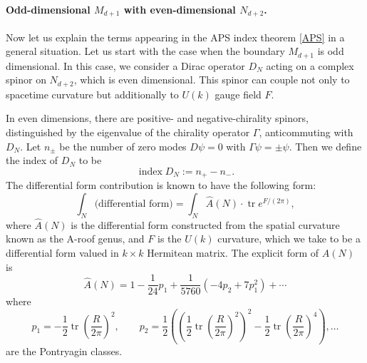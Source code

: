 \documentclass[12pt]{article}
\numberwithin{equation}{section}
\numberwithin{figure}{section}
\theoremstyle{remark}
\def\index{\mathop{\mathrm{index}}}
\def\tr{\mathop{\mathrm{tr}}\nolimits}
\begin{document}
\paragraph{Odd-dimensional $M_{d+1}$ with even-dimensional $N_{d+2}$.}

Now let us explain the terms appearing in the APS index theorem \eqref{APS}
in a general situation.
Let us start with the case when the boundary $M_{d+1}$ is odd dimensional.
In this case, we consider a Dirac operator $D_N$ acting on a complex spinor on $N_{d+2}$, which is even dimensional.
This spinor can couple not only to spacetime curvature but additionally to $U(k)$ gauge field $F$.

In even dimensions, there are positive- and negative-chirality spinors, distinguished by the eigenvalue of the chirality operator $\Gamma$, anticommuting with $D_N$.
Let $n_\pm$ be the number of zero modes $D\psi=0$ with $\Gamma\psi=\pm \psi$.
Then we define the index of $D_N$ to be \begin{equation}
\index D_N := n_+ - n_-.
\end{equation}
The differential form contribution is known to have the following form:
\begin{equation}
\int_N \text{(differential form)} = \int_N \hat A(N) \cdot \tr e^{F/(2\pi)},
\end{equation}
where $\hat A(N)$ is the differential form constructed from the spatial curvature known as the A-roof genus,
and $F$ is the $U(k)$ curvature, which we take to be a differential form valued in $k\times k$ Hermitean matrix.
The explicit form of $\hat A(N)$ is \begin{equation}
\hat A(N)=1-\frac{1}{24} p_1 + \frac{1}{5760}(-4p_2+7p_1^2) + \cdots
\end{equation} where \begin{equation}
p_1=-\frac12\tr (\frac{R}{2\pi})^2,\qquad p_2=  \frac12\left((\frac12\tr (\frac{R}{2\pi})^2)^2 - \frac12\tr (\frac{R}{2\pi})^4 \right), \ldots
\end{equation}
are the Pontryagin classes.
\end{document}

